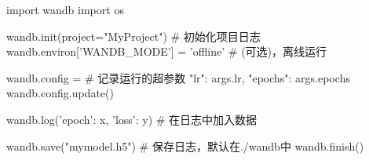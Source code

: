     \begin{codeblock}[language=python, caption={wandb}]
      import wandb
      import os

      wandb.init(project="MyProject") # 初始化项目日志
      wandb.environ['WANDB_MODE'] = 'offline' # (可选)，离线运行

      wandb.config = { # 记录运行的超参数
        "lr": args.lr,
        "epochs": args.epochs
      }
      wandb.config.update()

      wandb.log({'epoch': x, 'loss': y}) # 在日志中加入数据

      wandb.save("mymodel.h5") # 保存日志，默认在./wandb中
      wandb.finish()
    \end{codeblock}

